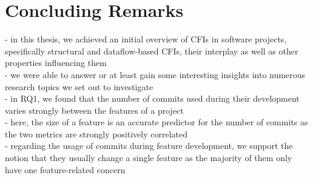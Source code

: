 \chapter{Concluding Remarks}\label{ch:conclusion}



- in this thesis, we achieved an initial overview of CFIs in software projects, specifically structural and dataflow-based CFIs, their interplay as well as other properties influencing them \\
- we were able to answer or at least gain some interesting insights into numerous research topics we set out to investigate \\

- in RQ1, we found that the number of commits used during their development varies strongly between the features of a project \\
- here, the size of a feature is an accurate predictor for the number of commits as the two metrics are strongly positively correlated \\
- regarding the usage of commits during feature development, we support the notion that they usually change a single feature as the majority of them only have one feature-related concern \cite{} \\


